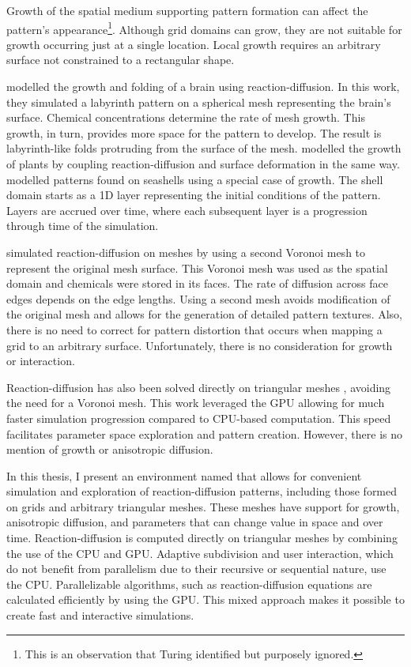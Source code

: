 Growth of the spatial medium supporting pattern formation can affect the pattern's appearance\footnote{This is an observation that Turing identified but purposely ignored.}. Although grid domains can grow, they are not suitable for growth occurring just at a single location. Local growth requires an arbitrary surface not constrained to a rectangular shape.

\citet{lefevre2010} modelled the growth and folding of a brain using reaction-diffusion. In this work, they simulated a labyrinth pattern on a spherical mesh representing the brain's surface. Chemical concentrations determine the rate of mesh growth. This growth, in turn, provides more space for the pattern to develop. The result is labyrinth-like folds protruding from the surface of the mesh. \citet{harrison2002, holloway2007} modelled the growth of plants by coupling reaction-diffusion and surface deformation in the same way. \citet{fowler1992} modelled patterns found on seashells using a special case of growth. The shell domain starts as a 1D layer representing the initial conditions of the pattern. Layers are accrued over time, where each subsequent layer is a progression through time of the simulation.

\citet{turk1991} simulated reaction-diffusion on meshes by using a second Voronoi mesh to represent the original mesh surface. This Voronoi mesh was used as the spatial domain and chemicals were stored in its faces. The rate of diffusion across face edges depends on the edge lengths. Using a second mesh avoids modification of the original mesh and allows for the generation of detailed pattern textures. Also, there is no need to correct for pattern distortion that occurs when mapping a grid to an arbitrary surface. Unfortunately, there is no consideration for growth or interaction. %

Reaction-diffusion has also been solved directly on triangular meshes \citep{descombes2016}, avoiding the need for a Voronoi mesh. This work leveraged the GPU allowing for much faster simulation progression compared to CPU-based computation. This speed facilitates parameter space exploration and pattern creation. However, there is no mention of growth or anisotropic diffusion.

In this thesis, I present an environment named \ProgramName{} that allows for convenient simulation and exploration of reaction-diffusion patterns, including those formed on grids and arbitrary triangular meshes. These meshes have support for growth, anisotropic diffusion, and parameters that can change value in space and over time. Reaction-diffusion is computed directly on triangular meshes by combining the use of the CPU and GPU. Adaptive subdivision and user interaction, which do not benefit from parallelism due to their recursive or sequential nature,  use the CPU. Parallelizable algorithms, such as reaction-diffusion equations are calculated efficiently by using the GPU. This mixed approach makes it possible to create fast and interactive simulations. 

